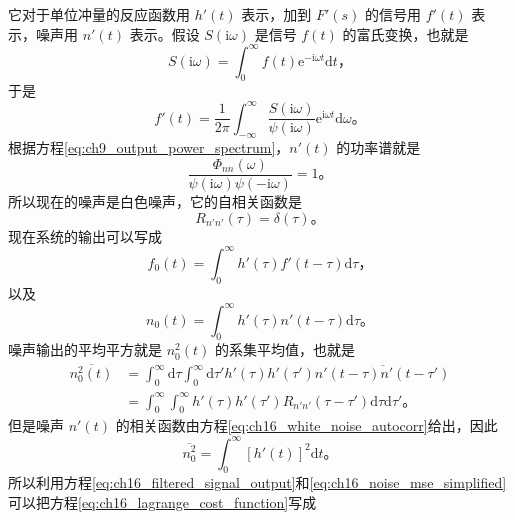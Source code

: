 它对于单位冲量的反应函数用 $h'(t)$ 表示，加到 $F'(s)$ 的信号用 $f'(t)$ 表示，噪声用 $n'(t)$ 表示。假设 $S(\mathrm{i}\omega)$ 是信号 $f(t)$ 的富氏变换，也就是
\begin{equation}
S(\mathrm{i}\omega) = \int_{0}^{\infty} f(t)\mathrm{e}^{-\mathrm{i}\omega t}\mathrm{d}t，
\label{eq:ch16_signal_fourier_transform}
\end{equation}
于是
\begin{equation}
f'(t) = \frac{1}{2\pi}\int_{-\infty}^{\infty} \frac{S(\mathrm{i}\omega)}{\psi(\mathrm{i}\omega)}\mathrm{e}^{\mathrm{i}\omega t}\mathrm{d}\omega。
\label{eq:ch16_transformed_input_signal}
\end{equation}
根据方程\eqref{eq:ch9_output_power_spectrum}，$n'(t)$ 的功率谱就是
\begin{equation*}
\frac{\Phi_{nn}(\omega)}{\psi(\mathrm{i}\omega)\psi(-\mathrm{i}\omega)} = 1。
\end{equation*}
所以现在的噪声是白色噪声，它的自相关函数是
\begin{equation}
R_{n'n'}(\tau) = \delta(\tau)。
\label{eq:ch16_white_noise_autocorr}
\end{equation}
现在系统的输出可以写成
\begin{equation}
f_0(t) = \int_{0}^{\infty} h'(\tau)f'(t-\tau)\mathrm{d}\tau，
\label{eq:ch16_filtered_signal_output}
\end{equation}
以及
\begin{equation}
n_0(t) = \int_{0}^{\infty} h'(\tau)n'(t-\tau)\mathrm{d}\tau。
\label{eq:ch16_filtered_noise_output}
\end{equation}
噪声输出的平均平方就是 $n_0^2(t)$ 的系集平均值，也就是
\begin{equation*}
\begin{aligned}
\overline{n_0^2(t)} &= \int_{0}^{\infty}\mathrm{d}\tau\int_{0}^{\infty}\mathrm{d}\tau'h'(\tau)h'(\tau')\overline{n'(t-\tau)n'(t-\tau')} \\
&= \int_{0}^{\infty}\int_{0}^{\infty} h'(\tau)h'(\tau')R_{n'n'}(\tau-\tau')\mathrm{d}\tau\mathrm{d}\tau'。
\end{aligned}
\end{equation*}
但是噪声 $n'(t)$ 的相关函数由方程\eqref{eq:ch16_white_noise_autocorr}给出，因此
\begin{equation}
\overline{n_0^2} = \int_{0}^{\infty}\left[h'(t)\right]^2\mathrm{d}t。
\label{eq:ch16_noise_mse_simplified}
\end{equation}
所以利用方程\eqref{eq:ch16_filtered_signal_output}和\eqref{eq:ch16_noise_mse_simplified}可以把方程\eqref{eq:ch16_lagrange_cost_function}写成
